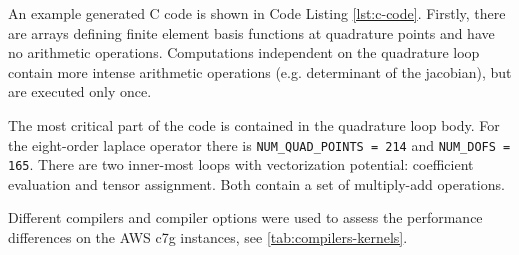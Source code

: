 An example generated C code is shown in Code Listing \ref{lst:c-code}. Firstly,
there are arrays defining finite element basis functions at quadrature points
and have no arithmetic operations. Computations independent on the quadrature
loop contain more intense arithmetic operations (e.g. determinant of the
jacobian), but are executed only once.

The most critical part of the code is contained in the quadrature loop body. For
the eight-order laplace operator there is \lstinline{NUM_QUAD_POINTS = 214} and
\lstinline{NUM_DOFS = 165}. There are two inner-most loops with vectorization
potential: coefficient evaluation and tensor assignment. Both contain a set of
multiply-add operations.

Different compilers and compiler options were used to assess the performance
differences on the AWS c7g instances, see \autoref{tab:compilers-kernels}.

